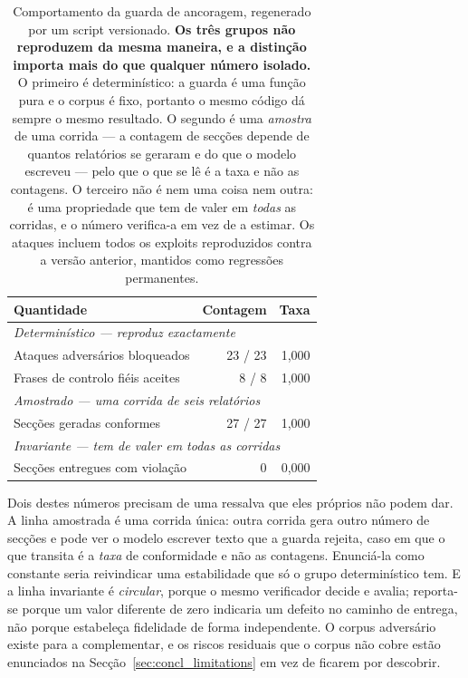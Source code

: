 \begin{table}[ht]
\centering
\caption[Comportamento medido da guarda de ancoragem]{Comportamento da guarda de ancoragem,
regenerado por um script versionado. \textbf{Os três grupos não reproduzem da mesma maneira, e a
distinção importa mais do que qualquer número isolado.} O primeiro é determinístico: a guarda é uma
função pura e o corpus é fixo, portanto o mesmo código dá sempre o mesmo resultado. O segundo é uma
\emph{amostra} de uma corrida --- a contagem de secções depende de quantos relatórios se geraram e do
que o modelo escreveu --- pelo que o que se lê é a taxa e não as contagens. O terceiro não é nem uma
coisa nem outra: é uma propriedade que tem de valer em \emph{todas} as corridas, e o número
verifica-a em vez de a estimar. Os ataques incluem todos os exploits reproduzidos contra a versão
anterior, mantidos como regressões permanentes.}
\label{tab:guard_measured}
\begin{tabular}{lrr}
\toprule
Quantidade & Contagem & Taxa \\
\midrule
\multicolumn{3}{l}{\emph{Determinístico --- reproduz exactamente}} \\
Ataques adversários bloqueados      & 23 / 23 & 1,000 \\
Frases de controlo fiéis aceites    & 8 / 8   & 1,000 \\
\midrule
\multicolumn{3}{l}{\emph{Amostrado --- uma corrida de seis relatórios}} \\
Secções geradas conformes           & 27 / 27 & 1,000 \\
\midrule
\multicolumn{3}{l}{\emph{Invariante --- tem de valer em todas as corridas}} \\
Secções entregues com violação      & 0       & 0,000 \\
\bottomrule
\end{tabular}
\end{table}

Dois destes números precisam de uma ressalva que eles próprios não podem dar. A linha amostrada é
uma corrida única: outra corrida gera outro número de secções e pode ver o modelo escrever texto que
a guarda rejeita, caso em que o que transita é a \emph{taxa} de conformidade e não as contagens.
Enunciá-la como constante seria reivindicar uma estabilidade que só o grupo determinístico tem. E a
linha invariante é \emph{circular}, porque o mesmo verificador decide e avalia; reporta-se porque um
valor diferente de zero indicaria um defeito no caminho de entrega, não porque estabeleça fidelidade
de forma independente. O corpus adversário existe para a complementar, e os riscos residuais que o
corpus não cobre estão enunciados na Secção~\ref{sec:concl_limitations} em vez de ficarem por
descobrir.

